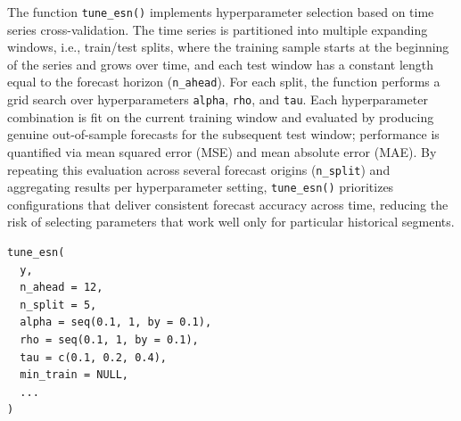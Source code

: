 The function \texttt{tune\_esn()} implements hyperparameter selection based on time series cross-validation. The time series is partitioned into multiple expanding windows, i.e., train/test splits, where the training sample starts at the beginning of the series and grows over time, and each test window has a constant length equal to the forecast horizon (\texttt{n\_ahead}). For each split, the function performs a grid search over hyperparameters \texttt{alpha}, \texttt{rho}, and \texttt{tau}. Each hyperparameter combination is fit on the current training window and evaluated by producing genuine out-of-sample forecasts for the subsequent test window; performance is quantified via mean squared error (MSE) and mean absolute error (MAE). By repeating this evaluation across several forecast origins (\texttt{n\_split}) and aggregating results per hyperparameter setting, \texttt{tune\_esn()} prioritizes configurations that deliver consistent forecast accuracy across time, reducing the risk of selecting parameters that work well only for particular historical segments.

\begin{verbatim}
tune_esn(
  y,
  n_ahead = 12,
  n_split = 5,
  alpha = seq(0.1, 1, by = 0.1),
  rho = seq(0.1, 1, by = 0.1),
  tau = c(0.1, 0.2, 0.4),
  min_train = NULL,
  ...
)
\end{verbatim}

